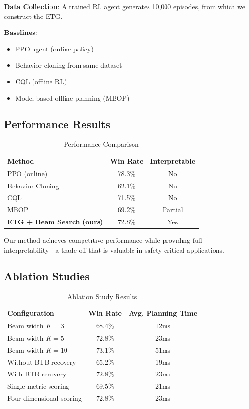 \documentclass[letterpaper]{article}
\begin{document}
\textbf{Data Collection}: A trained RL agent generates 10,000 episodes, from which we construct the ETG.

\textbf{Baselines}:
\begin{itemize}
    \item PPO agent (online policy) \cite{schulman2017ppo}
    \item Behavior cloning from same dataset \cite{fujimoto2021bc}
    \item CQL (offline RL) \cite{kumar2020cql}
    \item Model-based offline planning (MBOP) \cite{argenson2021mbop}
\end{itemize}

\subsection{Performance Results}

\begin{table}[h]
\centering
\begin{tabular}{lcc}
\toprule
\textbf{Method} & \textbf{Win Rate} & \textbf{Interpretable} \\
\midrule
PPO (online) & 78.3\% & No \\
Behavior Cloning & 62.1\% & No \\
CQL & 71.5\% & No \\
MBOP & 69.2\% & Partial \\
\textbf{ETG + Beam Search (ours)} & 72.8\% & Yes \\
\bottomrule
\end{tabular}
\caption{Performance Comparison}
\end{table}

Our method achieves competitive performance while providing full interpretability—a trade-off that is valuable in safety-critical applications.

\subsection{Ablation Studies}

\begin{table}[h]
\centering
\begin{tabular}{lcc}
\toprule
\textbf{Configuration} & \textbf{Win Rate} & \textbf{Avg. Planning Time} \\
\midrule
Beam width $K=3$ & 68.4\% & 12ms \\
Beam width $K=5$ & 72.8\% & 23ms \\
Beam width $K=10$ & 73.1\% & 51ms \\
\midrule
Without BTB recovery & 65.2\% & 19ms \\
With BTB recovery & 72.8\% & 23ms \\
\midrule
Single metric scoring & 69.5\% & 21ms \\
Four-dimensional scoring & 72.8\% & 23ms \\
\bottomrule
\end{tabular}
\caption{Ablation Study Results}
\end{table}
\end{document}
